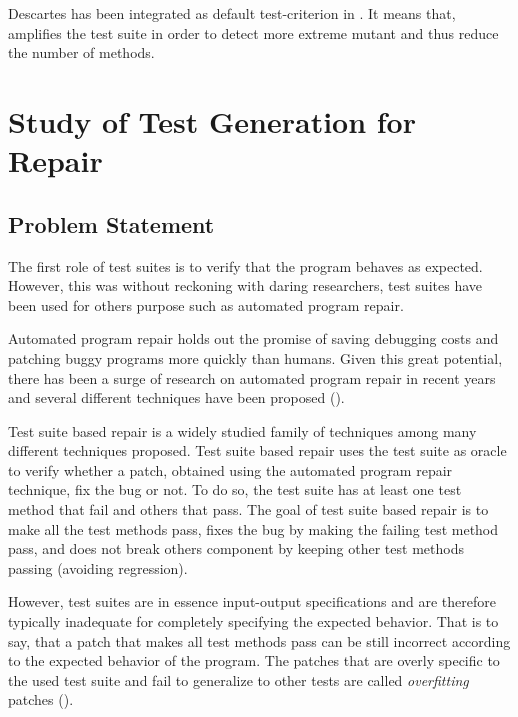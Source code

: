 Descartes has been integrated as default test-criterion in \dspot.
It means that, \dspot amplifies the test suite in order to detect more extreme mutant and thus reduce the number of \pseudotested methods.

\section{Study of Test Generation for Repair}
\label{sec:transversal-contributions:test-for-repair}


\subsection{Problem Statement}
\label{subsec:transversal-contributions:test-for-repair:introduction}

The first role of test suites is to verify that the program behaves as expected.
However, this was without reckoning with daring researchers, test suites have been used for others purpose such as automated program repair.

Automated program repair holds out the promise of saving debugging costs and patching buggy programs more quickly than humans. 
Given this great potential, there has been a surge of research on automated program repair in recent years and several different techniques have been proposed (\cite{genprog,semfix,nopol,tsepei,long2017automatic}).

Test suite based repair is a widely studied family of techniques among many different techniques proposed.
Test suite based repair uses the test suite as oracle to verify whether a patch, obtained using the automated program repair technique, fix the bug or not.
To do so, the test suite has at least one test method that fail and others that pass.
The goal of test suite based repair is to make all the test methods pass, \ie fixes the bug by making the failing test method pass, and does not break others component by keeping other test methods passing (avoiding regression).

However, test suites are in essence input-output specifications and are therefore typically inadequate for completely specifying the expected behavior.
That is to say, that a patch that makes all test methods pass can be still incorrect according to the expected behavior of the program.
The patches that are overly specific to the used test suite and fail to generalize to other tests are called \emph{overfitting} patches (\cite{smith2015cure}).

